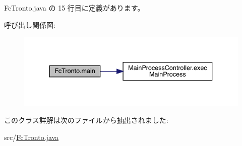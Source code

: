  Fc\+Tronto.\+java の 15 行目に定義があります。

呼び出し関係図\+:\nopagebreak
\begin{figure}[H]
\begin{center}
\leavevmode
\includegraphics[width=337pt]{d0/d50/class_fc_tronto_a3e0328e996d4755d3624e9217c5848dc_cgraph}
\end{center}
\end{figure}


このクラス詳解は次のファイルから抽出されました\+:\begin{DoxyCompactItemize}
\item 
src/\mbox{\hyperlink{_fc_tronto_8java}{Fc\+Tronto.\+java}}\end{DoxyCompactItemize}
